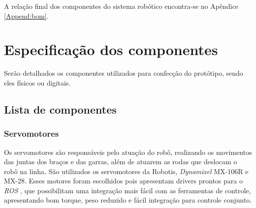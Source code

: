 
A relação final dos componentes do sistema robótico encontra-se no Apêndice \ref{Append:bom}.

\section{Especificação dos componentes}
\label{sec:espc}
Serão detalhados os componentes utilizados para confecção do protótipo, sendo eles físicos ou digitais.


\subsection{Lista de componentes}
\label{ssec:list}


\subsubsection{Servomotores}
Os servomotores são responsáveis pelo atuação do robô, realizando os movimentos das juntas dos braços e das garras, além de atuarem as rodas que deslocam o robô na linha. São utilizados os servomotores da Robotis, \textit{Dynamixel} MX-106R e MX-28. Esses motores foram escolhidos pois apresentam drivers prontos para o \textit{ROS} , que possibilitam uma integração mais fácil com as ferramentas de controle, apresentando bom torque, peso reduzido e fácil integração para controle conjunto.


